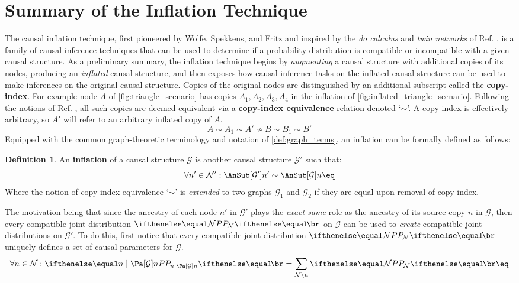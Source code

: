 \documentclass[aps, 10pt, english, twoside, pra, nofootinbib, longbibliography]{revtex4-1}
\theoremstyle{plain}
\theoremstyle{definition}
\newtheorem{definition}[theorem]{Definition}
\theoremstyle{remark}
\newcommand{\graph}{\mathcal{G}}
\newcommand{\nodes}{\mathcal{N}}
\newcommand{\term}[1]{\textcolor{Mahogany}{\textbf{#1}}}
\begin{document}
    \section{Summary of the Inflation Technique}
    \label{sec:summary_inflation}
    The causal inflation technique, first pioneered by Wolfe, Spekkens, and Fritz \cite{Inflation} and inspired by the \textit{do calculus} and \textit{twin networks} of Ref. \cite{Pearl_2009}, is a family of causal inference techniques that can be used to determine if a probability distribution is compatible or incompatible with a given causal structure. As a preliminary summary, the inflation technique begins by \textit{augmenting} a causal structure with additional copies of its nodes, producing an \textit{inflated} causal structure, and then exposes how causal inference tasks on the inflated causal structure can be used to make inferences on the original causal structure. Copies of the original nodes are distinguished by an additional subscript called the \term{copy-index}. For example node $A$ of \cref{fig:triangle_scenario} has copies $A_1, A_2, A_3, A_4$ in the inflation of \cref{fig:inflated_triangle_scenario}. Following the notions of Ref. \cite{Inflation}, all such copies are deemed equivalent via a \term{copy-index equivalence} relation denoted `$\sim$'. A copy-index is effectively arbitrary, so $A'$ will refer to an arbitrary inflated copy of $A$.
    \[ A \sim A_1 \sim A' \not\sim B \sim B_1 \sim B' \]
    Equipped with the common graph-theoretic terminology and notation of \cref{def:graph_terms}, an inflation can be formally defined as follows:
    \begin{definition}
        An \term{inflation} of a causal structure $\graph$ is another causal structure $\graph'$ such that:
        \[ \forall n' \in \nodes': \AnSub[\graph']{n'} \sim \AnSub[\graph]{n} \eq \label{eq:inflation_defn}\]
        Where the notion of copy-index equivalence `$\sim$' is \textit{extended} to two graphs $\graph_1$ and $\graph_2$ if they are equal upon removal of copy-index.
    \end{definition}
    The motivation being that since the ancestry of each node $n'$ in $\graph'$ plays the \textit{exact same} role as the ancestry of its source copy $n$ in $\graph$, then every compatible joint distribution $\prob[\nodes]$ on $\graph$ can be used to \textit{create} compatible joint distributions on $\graph'$. To do this, first notice that every compatible joint distribution $\prob[\nodes]$ uniquely defines a set of causal parameters for $\graph$.
    \[ \forall n \in \nodes : \prob[n\mid \Pa[\graph]{n}] = \sum_{\nodes \setminus n} \prob[\nodes] \eq \label{eq:unique_causal_parameters}\]
\end{document}
